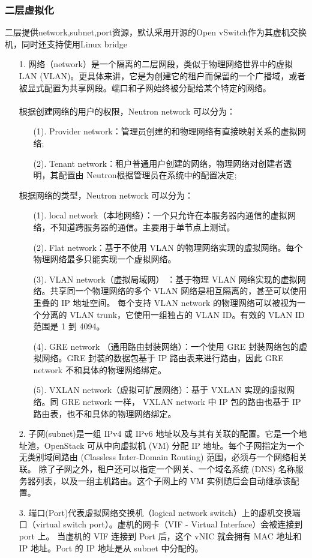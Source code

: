 \documentclass[a4paper,left=1.5cm,right=1.5cm,11pt]{article}
\begin{document}
\subsubsection{二层虚拟化}
二层提供network,subnet,port资源，默认采用开源的Open vSwitch作为其虚机交换机，同时还支持使用Linux bridge
\begin{itemize}
	\item[1.]网络（network）是一个隔离的二层网段，类似于物理网络世界中的虚拟 LAN (VLAN)。更具体来讲，它是为创建它的租户而保留的一个广播域，或者被显式配置为共享网段。端口和子网始终被分配给某个特定的网络。
	\\\\
	根据创建网络的用户的权限，Neutron network 可以分为：
	\begin{itemize}
		\item[(1).]Provider network：管理员创建的和物理网络有直接映射关系的虚拟网络;
		\item[(2).]Tenant network：租户普通用户创建的网络，物理网络对创建者透明，其配置由 Neutron根据管理员在系统中的配置决定;
	\end{itemize}
	根据网络的类型，Neutron network 可以分为：
	\begin{itemize}
		\item[(1).]local network（本地网络）：一个只允许在本服务器内通信的虚拟网络，不知道跨服务器的通信。主要用于单节点上测试。
		\item[(2).]Flat network：基于不使用 VLAN 的物理网络实现的虚拟网络。每个物理网络最多只能实现一个虚拟网络。
		\item[(3).]VLAN network（虚拟局域网） ：基于物理 VLAN 网络实现的虚拟网络。共享同一个物理网络的多个 VLAN 网络是相互隔离的，甚至可以使用重叠的 IP 地址空间。
		每个支持 VLAN network 的物理网络可以被视为一个分离的 VLAN trunk，它使用一组独占的 VLAN ID。有效的 VLAN ID 范围是 1 到 4094。
		\item[(4).]GRE network （通用路由封装网络）：一个使用 GRE 封装网络包的虚拟网络。GRE 封装的数据包基于 IP 路由表来进行路由，因此 GRE network 不和具体的物理网络绑定。
		\item[(5).]VXLAN network（虚拟可扩展网络）：基于 VXLAN 实现的虚拟网络。同 GRE network 一样， VXLAN network 中 IP 包的路由也基于 IP 路由表，也不和具体的物理网络绑定。
	\end{itemize}
	\item[2.]子网(subnet)是一组 IPv4 或 IPv6 地址以及与其有关联的配置。它是一个地址池，OpenStack 可从中向虚拟机 (VM) 分配 IP 地址。每个子网指定为一个无类别域间路由 (Classless Inter-Domain Routing) 范围，必须与一个网络相关联。
	除了子网之外，租户还可以指定一个网关、一个域名系统 (DNS) 名称服务器列表，以及一组主机路由。这个子网上的 VM 实例随后会自动继承该配置。
	\item[3.]端口(Port)代表虚拟网络交换机（logical network switch）上的虚机交换端口（virtual switch port）。虚机的网卡（VIF - Virtual Interface）会被连接到 port 上。
	当虚机的 VIF 连接到 Port 后，这个 vNIC 就会拥有 MAC 地址和 IP 地址。Port 的 IP 地址是从 subnet 中分配的。
\end{itemize}
\end{document}

